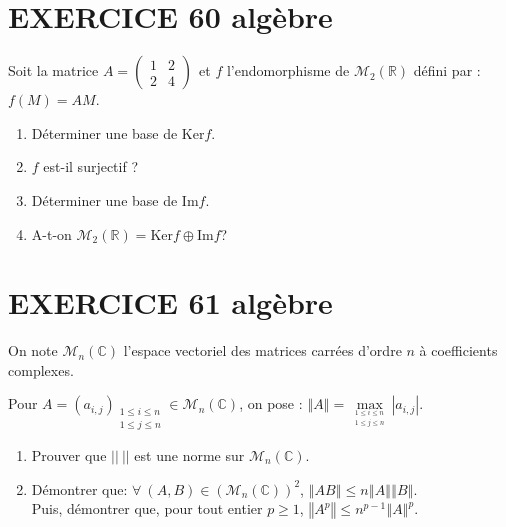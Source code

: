 \documentclass[10pt,oneside]{article}
\begin{document}
\begin{flushleft}
\section*{EXERCICE 60 \: algèbre }

Soit la matrice $A=\left( 
\begin{array}{cc}
1 & 2 \\ 
2 & 4%
\end{array}%
\right) \ \ $et $f$ l'endomorphisme de $\mathcal{M}_{2}\left( \mathbb{R}%
\right) $ d\'{e}fini par :\ \ \ $f\left( M\right) =AM.$

\begin{enumerate}

\item D\'{e}terminer une base de  $\mathrm{Ker}f$. 

\item $f$ est-il surjectif ? 

\item Déterminer une base de $ \text{Im}f.$\smallskip
\item
A-t-on $\mathcal{M}_{2}\left( \mathbb{R}%
\right)=\mathrm{Ker}f\oplus \mathrm{Im}f$?
\end{enumerate}

\section*{EXERCICE 61 \: algèbre }

On note $\mathcal{M}_{n}\left( \mathbb{C}\right)$ l'espace vectoriel des matrices carr\'{e}es d'ordre $n$ \`{a} coefficients complexes.

Pour $A=\left( a_{i,j}\right) _{\substack{ 1\leqslant i\leqslant n  \\ 1\leqslant j\leqslant n}}\in \mathcal{M}_{n}\left( \mathbb{C}\right)$, on pose : 
$\left\Vert A\right\Vert =\underset{_{\substack{ 1\leqslant i\leqslant n  \\ 1\leqslant j\leqslant n}}}{\max }\left\vert a_{i,j}\right\vert$.

\begin{enumerate}


\item
Prouver que $||\:||$ est une norme sur $\mathcal{M}_{n}\left( \mathbb{C}\right)$.
\item Démontrer que: $\forall\:(A,B)\in \left( \mathcal{M}_{n}\left( \mathbb{C}\right)\right) ^2$,  $\left\Vert AB\right\Vert \leqslant n\left\Vert A\right\Vert \left\Vert B\right\Vert $.\\
Puis, démontrer que,  pour tout entier $p\geqslant 1$, $\left\Vert A^{p}\right\Vert \leqslant n^{p-1}\left\Vert A\right\Vert ^{p}$.


\end{enumerate}
\end{flushleft}
\end{document}
